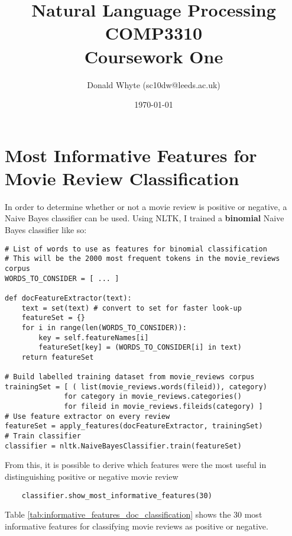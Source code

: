 \documentclass{article}
\title{Natural Language Processing \\ COMP3310 \\ Coursework One}
\author{Donald Whyte (sc10dw@leeds.ac.uk)}
\date{\today}
\begin{document}
\lstset{language=Python}

\maketitle

\section{Most Informative Features for Movie Review Classification}

In order to determine whether or not a movie review is positive or negative, a Naive Bayes classifier can be used. Using NLTK, I trained a \textbf{binomial} Naive Bayes classifier like so:

\begin{lstlisting}
# List of words to use as features for binomial classification
# This will be the 2000 most frequent tokens in the movie_reviews corpus
WORDS_TO_CONSIDER = [ ... ]

def docFeatureExtractor(text):
	text = set(text) # convert to set for faster look-up
	featureSet = {}
	for i in range(len(WORDS_TO_CONSIDER)):
		key = self.featureNames[i]
		featureSet[key] = (WORDS_TO_CONSIDER[i] in text)
	return featureSet

# Build labelled training dataset from movie_reviews corpus
trainingSet = [ ( list(movie_reviews.words(fileid)), category)
			  for category in movie_reviews.categories()
			  for fileid in movie_reviews.fileids(category) ] 
# Use feature extractor on every review
featureSet = apply_features(docFeatureExtractor, trainingSet)
# Train classifier 
classifier = nltk.NaiveBayesClassifier.train(featureSet)
\end{lstlisting}

From this, it is possible to derive which features were the most useful in distinguishing positive or negative movie review

\begin{lstlisting}
	classifier.show_most_informative_features(30)
\end{lstlisting}
Table \ref{tab:informative_features_doc_classification} shows the 30 most informative features for classifying movie reviews as positive or negative.
\end{document}
